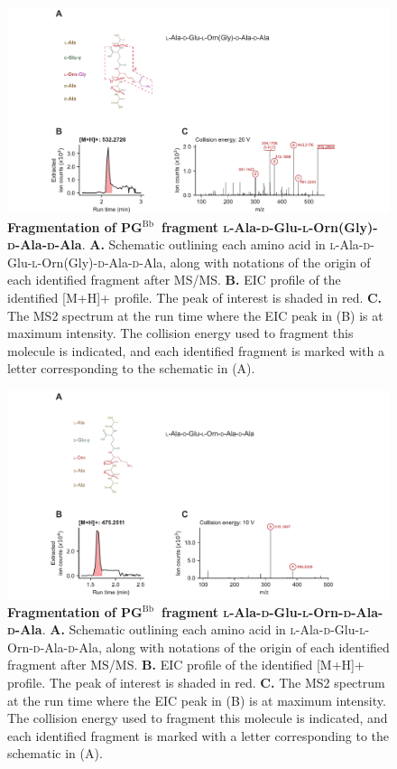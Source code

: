 \documentclass[twoside, watermark]{zHenriquesLab-StyleBioRxiv}
\newcommand{\pgbb}{PG$^\text{Bb}$}
\newcommand{\AEOAAG}{\textsc{l}-Ala-\textsc{d}-Glu-\textsc{l}-Orn(Gly)-\textsc{d}-Ala-\textsc{d}-Ala}
\newcommand{\AEOAA}{\textsc{l}-Ala-\textsc{d}-Glu-\textsc{l}-Orn-\textsc{d}-Ala-\textsc{d}-Ala}
\begin{document}
\vspace{-15cm}
\begin{figure}[ht!]
    \centering
    \includegraphics[width = \textwidth]{Figures/Figure_S1_AEOAAG_MSMS.pdf}
    \caption{\textbf{Fragmentation of \pgbb~fragment \AEOAAG}. \textbf{A.} Schematic outlining each amino acid in \AEOAAG, along with notations of the origin of each identified fragment after MS/MS. \textbf{B.} EIC profile of the identified [M+H]+ profile. The peak of interest is shaded in red. \textbf{C.} The MS2 spectrum at the run time where the EIC peak in (B) is at maximum intensity. The collision energy used to fragment this molecule is indicated, and each identified fragment is marked with a letter corresponding to the schematic in (A).}
    \label{fig: figS1}
\end{figure}

\pagebreak
\begin{figure}[ht!]
    \centering
    \includegraphics[width = \textwidth]{Figures/Figure_S2_AEOAA_MSMS.pdf}
    \caption{\textbf{Fragmentation of \pgbb~fragment \AEOAA}. \textbf{A.} Schematic outlining each amino acid in \AEOAA, along with notations of the origin of each identified fragment after MS/MS. \textbf{B.} EIC profile of the identified [M+H]+ profile. The peak of interest is shaded in red. \textbf{C.} The MS2 spectrum at the run time where the EIC peak in (B) is at maximum intensity. The collision energy used to fragment this molecule is indicated, and each identified fragment is marked with a letter corresponding to the schematic in (A).}
    \label{fig: figS2}
\end{figure}
\end{document}
